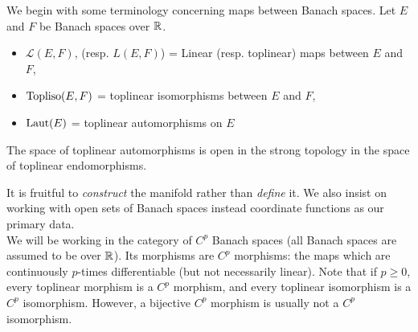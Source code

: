 \documentclass[../main-v2-manifolds.tex]{subfiles}
\begin{document}

We begin with some terminology concerning maps between Banach spaces. Let $E$ and $F$ be Banach spaces over $\mathbb{R}$.
\begin{itemize}
    \item $\mathcal{L}(E,F)$, (resp. $L(E,F)$) = Linear (resp. toplinear) maps between $E$ and $F$, 
    \item $\operatorname{Topliso}(E,F)$ = toplinear isomorphisms between $E$ and $F$,
    \item $\operatorname{Laut}(E)$ = toplinear automorphisms on $E$
\end{itemize}
\begin{remark}
    The space of toplinear automorphisms is open in the strong topology in the space of toplinear endomorphisms.
\end{remark}

It is fruitful to \emph{construct} the manifold rather than \emph{define} it. We also insist on working with open sets of Banach spaces instead coordinate functions as our primary data.\\

We will be working in the category of $C^p$ Banach spaces (all Banach spaces are assumed to be over $\mathbb{R}$). Its morphisms are $C^p$ morphisms: the maps which are continuously $p$-times differentiable (but not necessarily linear). Note that if $p\geq 0$, every toplinear morphism is a $C^p$ morphism, and every toplinear isomorphism is a $C^p$ isomorphism. However, a bijective $C^p$ morphism is usually not a $C^p$ isomorphism. 
\end{document}
